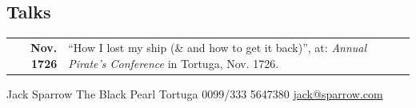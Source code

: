 \documentclass[lighthipster]{simplehipstercv}
\newlength{\rightcolwidth}
\begin{document}
\begin{paracol}{2}
\begin{minipage}[t]{0.3\textwidth}
\section*{Talks}
\begin{tabular}{>{\footnotesize\bfseries}r >{\footnotesize}p{}}
    Nov. 1726 & ``How I lost my ship (\& and how to get it back)'', at: \emph{Annual Pirate's Conference} in Tortuga, Nov. 1726.
\end{tabular}
\end{minipage}






\vfill{} %

\setlength{\parindent}{0pt}
\begin{minipage}[t]{\rightcolwidth}
\begin{center}\fontfamily{\sfdefault}\selectfont \color{black!70}
{\small Jack Sparrow  The Black Pearl  Tortuga  0099/333 5647380 \newline{} \protect\url{jack@sparrow.com}
}
\end{center}
\end{minipage}

\end{paracol}
\end{document}
